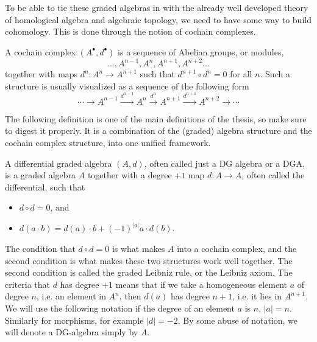 To be able to tie these graded algebras in with the already well developed theory of homological algebra and algebraic topology, we need to have some way to build cohomology. This is done through the notion of cochain complexes. 

\begin{definition}
A cochain complex $(A^{\bullet}, d^{\bullet})$ is a sequence of Abelian groups, or modules,
\begin{equation*}
    \ldots, A^{n-1}, A^n, A^{n+1}, A^{n+2}\ldots
\end{equation*}
together with maps $d^n:A^n\rightarrow A^{n+1}$ such that $d^{n+1}\circ d^n = 0$ for all $n$. Such a structure is usually visualized as a sequence of the following form
\begin{equation*}
    \cdots\longrightarrow A^{n-1} \overset{d^{n-1}}\longrightarrow A^n \overset{d^n}\longrightarrow A^{n+1} \overset{d^{n+1}}\longrightarrow A^{n+2}\longrightarrow\cdots
\end{equation*}
\end{definition}

The following definition is one of the main definitions of the thesis, so make sure to digest it properly. It is a combination of the (graded) algebra structure and the cochain complex structure, into one unified framework. 

\begin{definition}
\label{def:dga}
A differential graded algebra $(A, d)$, often called just a DG algebra or a DGA, is a graded algebra $A$ together with a degree $+1$ map $d: A\rightarrow A$, often called the differential, such that 
\begin{itemize}
    \item $d\circ d = 0$, and
    \item $d(a\cdot b) = d(a)\cdot b + (-1)^{|a|}a\cdot d(b)$. 
\end{itemize}
\end{definition}

The condition that $d\circ d = 0$ is what makes $A$ into a cochain complex, and the second condition is what makes these two structures work well together. The second condition is called the graded Leibniz rule, or the Leibniz axiom. The criteria that $d$ has degree $+1$ means that if we take a homogeneous element $a$ of degree $n$, i.e. an element in $A^n$, then $d(a)$ has degree $n+1$, i.e. it lies in $A^{n+1}$. We will use the following notation if the degree of an element $a$ is $n$, $|a|=n$. Similarly for morphisms, for example $|d|=-2$. By some abuse of notation, we will denote a DG-algebra simply by $A$.

